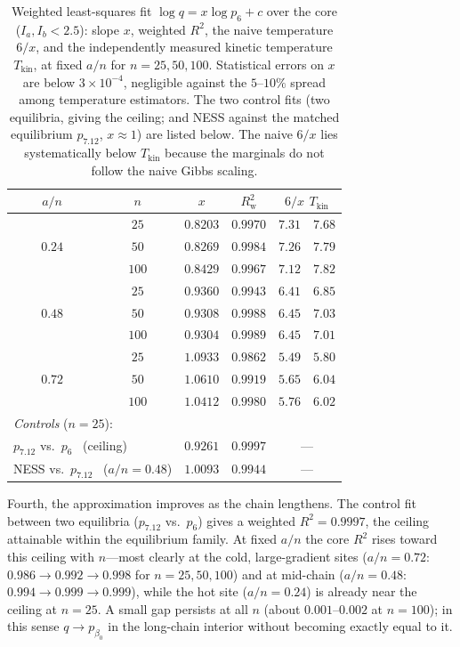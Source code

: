 \documentclass[11pt,a4paper]{article}
\theoremstyle{definition}
\numberwithin{equation}{section}   %
\begin{document}
\begin{table}[ht]\centering
\begin{tabular}{ccccc}
\hline
$a/n$ & $n$ & $x$ & $R^2_{\mathrm w}$ & $6/x$ \quad $T_{\mathrm{kin}}$ \\
\hline
       & $25$  & $0.8203$ & $0.9970$ & $7.31\quad 7.68$ \\
$0.24$ & $50$  & $0.8269$ & $0.9984$ & $7.26\quad 7.79$ \\
       & $100$ & $0.8429$ & $0.9967$ & $7.12\quad 7.82$ \\
\hline
       & $25$  & $0.9360$ & $0.9943$ & $6.41\quad 6.85$ \\
$0.48$ & $50$  & $0.9308$ & $0.9988$ & $6.45\quad 7.03$ \\
       & $100$ & $0.9304$ & $0.9989$ & $6.45\quad 7.01$ \\
\hline
       & $25$  & $1.0933$ & $0.9862$ & $5.49\quad 5.80$ \\
$0.72$ & $50$  & $1.0610$ & $0.9919$ & $5.65\quad 6.04$ \\
       & $100$ & $1.0412$ & $0.9980$ & $5.76\quad 6.02$ \\
\hline
\multicolumn{5}{l}{\emph{Controls} ($n=25$):}\\
\multicolumn{2}{l}{$p_{7.12}$ vs.\ $p_6$ \ (ceiling)}      & $0.9261$ & $0.9997$ & --- \\
\multicolumn{2}{l}{NESS vs.\ $p_{7.12}$ \ ($a/n{=}0.48$)}  & $1.0093$ & $0.9944$ & --- \\
\hline
\end{tabular}
\caption{Weighted least-squares fit $\log q=x\log p_6+c$ over the core
($I_a,I_b<2.5$): slope $x$, weighted $R^2$, the naive temperature $6/x$, and
the independently measured kinetic temperature $T_{\mathrm{kin}}$, at fixed
$a/n$ for $n=25,50,100$. Statistical errors on $x$ are below $3\times10^{-4}$,
negligible against the $5$--$10\%$ spread among temperature estimators. The
two control fits (two equilibria, giving the ceiling; and NESS against the
matched equilibrium $p_{7.12}$, $x\approx1$) are listed below. The naive
$6/x$ lies systematically below $T_{\mathrm{kin}}$ because the marginals do not
follow the naive Gibbs scaling.}
\label{tab:lte}
\end{table}

Fourth, the approximation improves as the chain lengthens. The control fit
between two equilibria ($p_{7.12}$ vs.\ $p_6$) gives a weighted $R^2=0.9997$,
the ceiling attainable within the equilibrium family. At fixed $a/n$ the core
$R^2$ rises toward this ceiling with $n$---most clearly at the cold,
large-gradient sites ($a/n=0.72$: $0.986\to0.992\to0.998$ for $n=25,50,100$)
and at mid-chain ($a/n=0.48$: $0.994\to0.999\to0.999$), while the hot site
($a/n=0.24$) is already near the ceiling at $n=25$. A small gap persists at
all $n$ (about $0.001$--$0.002$ at $n=100$); in this sense $q\to p_{\beta_0}$
in the long-chain interior without becoming exactly equal to it.
\end{document}
